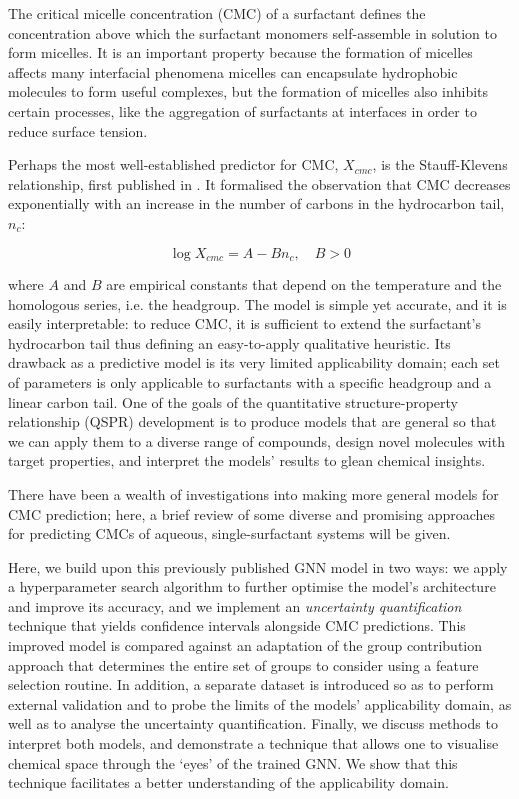 The critical micelle concentration (CMC) of a surfactant defines the concentration above which the surfactant monomers self-assemble in solution to form micelles. It is an important property because the formation of micelles affects many interfacial phenomena \cite{rosenSurfactantsInterfacialPhenomena2012} micelles can encapsulate hydrophobic molecules to form useful complexes, but the formation of micelles also inhibits certain processes, like the aggregation of surfactants at interfaces in order to reduce surface tension.

Perhaps the most well-established predictor for CMC, $X_{cmc}$, is the Stauff-Klevens relationship, first published in \citeyear{klevensStructureAggregationDilate1953} \cite{klevensStructureAggregationDilate1953}. It formalised the observation that CMC decreases exponentially with an increase in the number of carbons in the hydrocarbon tail, $n_c$:

\begin{equation}
    \label{eq:klevens}
    \log X_{cmc} = A - Bn_c, \quad B > 0
\end{equation}

where $A$ and $B$ are empirical constants that depend on the temperature and the homologous series, i.e. the headgroup. The model is simple yet accurate, and it is easily interpretable: to reduce CMC, it is sufficient to extend the surfactant's hydrocarbon tail thus defining an easy-to-apply qualitative heuristic. Its drawback as a predictive model is its very limited applicability domain; each set of parameters is only applicable to surfactants with a specific headgroup and a linear carbon tail.
One of the goals of the quantitative structure-property relationship (QSPR) development is to produce models that are general so that we can apply them to a diverse range of compounds, design novel molecules with target properties, and
interpret the models' results to glean chemical insights.

There have been a wealth of investigations into making more general models for
CMC prediction; here, a brief review of some diverse and promising approaches
for predicting CMCs of aqueous, single-surfactant systems will be given.



Here, we build upon this previously published GNN model in two ways: we apply a
hyperparameter search algorithm to further optimise the model's architecture and
improve its accuracy, and we implement an \emph{uncertainty quantification}
technique that yields confidence intervals alongside CMC predictions. This
improved model is compared against an adaptation of the group contribution
approach that determines the entire set of groups to consider using a feature
selection routine. In addition, a separate dataset is introduced so as to
perform external validation and to probe the limits of the models' applicability
domain, as well as to analyse the uncertainty quantification. Finally, we
discuss methods to interpret both models, and demonstrate a technique that
allows one to visualise chemical space through the `eyes' of the trained GNN. We
show that this technique facilitates a better understanding of the applicability
domain.